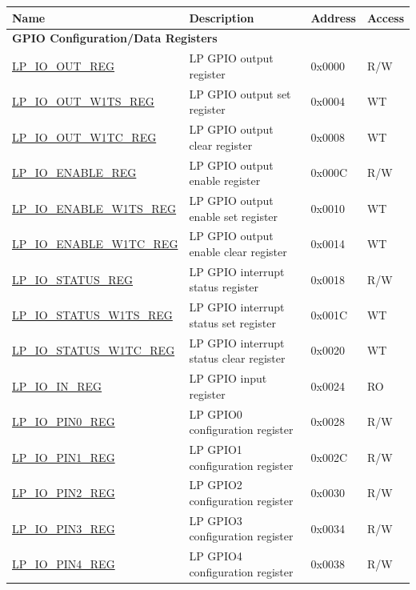 \begin{longtable}{ | p{6.2cm} | p{7cm} | p{1.3cm} | p{1cm} | }
\hline\rowcolor{lightgray}
\textbf{Name} & \textbf{Description} & \textbf{Address} & \textbf{Access} \\ \hline
\endhead
\multicolumn{4}{|l|}{\textbf{GPIO Configuration/Data Registers}} \\ \hline
\hyperref[regdesc:LPIOOUTREG]{LP\_IO\_OUT\_REG} & LP GPIO output register & 0x0000 & R/W \\ \hline
\hyperref[regdesc:LPIOOUTW1TSREG]{LP\_IO\_OUT\_W1TS\_REG} & LP GPIO output set register & 0x0004 & WT \\ \hline
\hyperref[regdesc:LPIOOUTW1TCREG]{LP\_IO\_OUT\_W1TC\_REG} & LP GPIO output clear register & 0x0008 & WT \\ \hline
\hyperref[regdesc:LPIOENABLEREG]{LP\_IO\_ENABLE\_REG} & LP GPIO output enable register & 0x000C & R/W \\ \hline
\hyperref[regdesc:LPIOENABLEW1TSREG]{LP\_IO\_ENABLE\_W1TS\_REG} & LP GPIO output enable set register & 0x0010 & WT \\ \hline
\hyperref[regdesc:LPIOENABLEW1TCREG]{LP\_IO\_ENABLE\_W1TC\_REG} & LP GPIO output enable clear register & 0x0014 & WT \\ \hline
\hyperref[regdesc:LPIOSTATUSREG]{LP\_IO\_STATUS\_REG} & LP GPIO interrupt status register & 0x0018 & R/W \\ \hline
\hyperref[regdesc:LPIOSTATUSW1TSREG]{LP\_IO\_STATUS\_W1TS\_REG} & LP GPIO interrupt status set register & 0x001C & WT \\ \hline
\hyperref[regdesc:LPIOSTATUSW1TCREG]{LP\_IO\_STATUS\_W1TC\_REG} & LP GPIO interrupt status clear register & 0x0020 & WT \\ \hline
\hyperref[regdesc:LPIOINREG]{LP\_IO\_IN\_REG} & LP GPIO input register & 0x0024 & RO \\ \hline
\hyperref[regdesc:LPIOPINNREG]{LP\_IO\_PIN0\_REG} & LP GPIO0 configuration register & 0x0028 & R/W \\ \hline
\hyperref[regdesc:LPIOPINNREG]{LP\_IO\_PIN1\_REG} & LP GPIO1 configuration register & 0x002C & R/W \\ \hline
\hyperref[regdesc:LPIOPINNREG]{LP\_IO\_PIN2\_REG} & LP GPIO2 configuration register & 0x0030 & R/W \\ \hline
\hyperref[regdesc:LPIOPINNREG]{LP\_IO\_PIN3\_REG} & LP GPIO3 configuration register & 0x0034 & R/W \\ \hline
\hyperref[regdesc:LPIOPINNREG]{LP\_IO\_PIN4\_REG} & LP GPIO4 configuration register & 0x0038 & R/W \\ \hline

\end{longtable}
